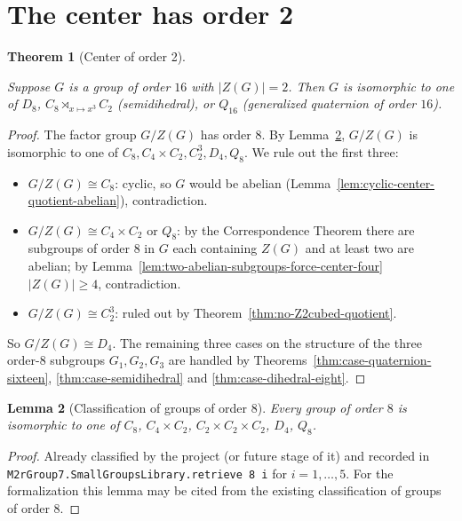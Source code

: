 \documentclass{article}
\newtheorem{theorem}{Theorem}[section]
\newtheorem{lemma}[theorem]{Lemma}
\theoremstyle{definition}
\newcommand{\lean}[1]{}
\newcommand{\leanfile}[1]{}
\newcommand{\uses}[1]{}
\begin{document}
\section{The center has order 2}

\begin{theorem}[Center of order 2]
    \label{thm:center-two}
    \lean{OrderSixteen.center_order_two}
    \leanfile{M2rGroup7/SixteenCase.lean}
    \uses{thm:case-quaternion-sixteen, thm:case-semidihedral, thm:case-dihedral-eight, lem:quotient-by-center-card, lem:cyclic-center-quotient-abelian, lem:two-abelian-subgroups-force-center-four, lem:order-eight-classification}
    Suppose $G$ is a group of order $16$ with $|Z(G)| = 2$. Then $G$ is
    isomorphic to one of $D_8$, $C_8 \rtimes_{x \mapsto x^3} C_2$
    (semidihedral), or $Q_{16}$ (generalized quaternion of order $16$).
\end{theorem}
\begin{proof}
    \uses{thm:case-quaternion-sixteen,thm:case-semidihedral,
          thm:case-dihedral-eight,lem:quotient-by-center-card,
          lem:cyclic-center-quotient-abelian,
          lem:two-abelian-subgroups-force-center-four,
          lem:order-eight-classification,
          thm:no-Z2cubed-quotient}
    The factor group $G/Z(G)$ has order $8$. By
    Lemma~\ref{lem:order-eight-classification}, $G/Z(G)$ is isomorphic to
    one of $C_8, C_4 \times C_2, C_2^3, D_4, Q_8$. We rule out the first
    three:
    \begin{itemize}
      \item $G/Z(G) \cong C_8$: cyclic, so $G$ would be abelian
        (Lemma~\ref{lem:cyclic-center-quotient-abelian}), contradiction.
      \item $G/Z(G) \cong C_4 \times C_2$ or $Q_8$: by the Correspondence
        Theorem there are subgroups of order $8$ in $G$ each containing
        $Z(G)$ and at least two are abelian; by
        Lemma~\ref{lem:two-abelian-subgroups-force-center-four}
        $|Z(G)| \ge 4$, contradiction.
      \item $G/Z(G) \cong C_2^3$: ruled out by
        Theorem~\ref{thm:no-Z2cubed-quotient}.
    \end{itemize}
    So $G/Z(G) \cong D_4$. The remaining three cases on the structure of the
    three order-$8$ subgroups $G_1, G_2, G_3$ are handled by
    Theorems~\ref{thm:case-quaternion-sixteen},
    \ref{thm:case-semidihedral} and \ref{thm:case-dihedral-eight}.
\end{proof}

\begin{lemma}[Classification of groups of order $8$]
    \label{lem:order-eight-classification}
    Every group of order $8$ is isomorphic to one of $C_8$, $C_4 \times C_2$,
    $C_2 \times C_2 \times C_2$, $D_4$, $Q_8$.
\end{lemma}
\begin{proof}
    Already classified by the project (or future stage of it) and recorded in
    \texttt{M2rGroup7.SmallGroupsLibrary.retrieve 8 i} for $i = 1, \dots, 5$.
    For the formalization this lemma may be cited from the existing
    classification of groups of order $8$.
\end{proof}
\end{document}
